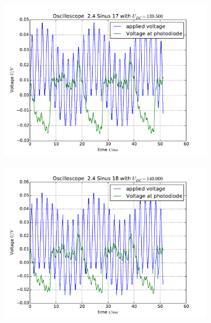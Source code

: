 \begin{figure}
    \begin{subfigure}[b]{\picwidth}
        \includegraphics[width=\textwidth]{analysis/figures/24sinus17}
        \caption{}
    \end{subfigure}\qquad
    \begin{subfigure}[b]{\picwidth}
        \includegraphics[width=\textwidth]{analysis/figures/24sinus18}
        \caption{}
    \end{subfigure}
    \begin{subfigure}[b]{\picwidth}

\end{subfigure}
\end{figure}
